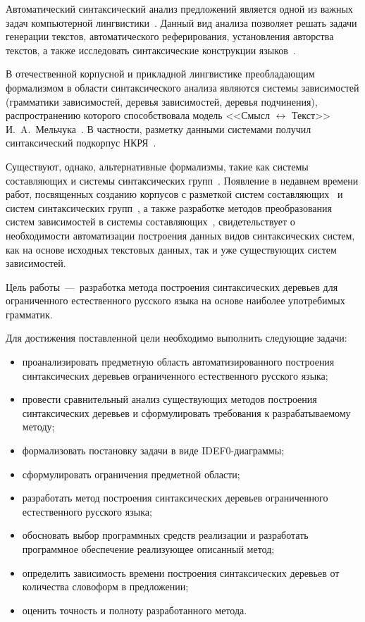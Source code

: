 
Автоматический синтаксический анализ предложений является одной из важных задач компьютерной лингвистики~\cite{Poletaev2023ConstituencyTree}. Данный вид анализа позволяет решать задачи генерации текстов, автоматического реферирования, установления авторства текстов, а также исследовать синтаксические конструкции языков~\cite{Zakirova2023Syntax,Zobnin2009ObjectATE}. 

В отечественной корпусной и прикладной лингвистике преобладающим формализмом в области синтаксического анализа являются системы зависимостей (грамматики зависимостей, деревья зависимостей, деревья подчинения), распространению которого способствовала модель <<Смысл $\leftrightarrow$ Текст>> И.~A.~Мельчука~\cite{inshakova2019razvitie}. В частности, разметку данными системами получил синтаксический подкорпус НКРЯ~\cite{ruscorpora}.

Существуют, однако, альтернативные формализмы, такие как системы составляющих и системы синтаксических групп~\cite{gladkij1985sintaksicheskie}. Появление в недавнем времени работ, посвященных созданию корпусов с разметкой систем составляющих~\cite{Grashchenkov2024RuConst} и систем синтаксических групп~\cite{DemidovEvchenko2024}, а также разработке методов преобразования систем зависимостей в системы составляющих~\cite{Poletaev2023ConstituencyTree}, свидетельствует о необходимости автоматизации построения данных видов синтаксических систем, как на основе исходных текстовых данных, так и уже существующих систем зависимостей.

Цель работы~---~разработка метода построения синтаксических деревьев для ограниченного естественного русского языка на основе наиболее употребимых грамматик.

Для достижения поставленной цели необходимо выполнить следующие задачи:
\begin{itemize}
	\item проанализировать предметную область автоматизированного построения синтаксических деревьев ограниченного естественного русского языка;
	\item провести сравнительный анализ существующих методов построения синтаксических деревьев и сформулировать требования к разрабатываемому методу;
	\item формализовать постановку задачи в виде IDEF0-диаграммы;
	\item сформулировать ограничения предметной области;
	\item разработать метод построения синтаксических деревьев ограниченного естественного русского языка;
	\item обосновать выбор программных средств реализации и разработать программное обеспечение реализующее описанный метод;
	\item определить зависимость времени построения синтаксических деревьев от количества словоформ в предложении;
	\item оценить точность и полноту разработанного метода.
\end{itemize}